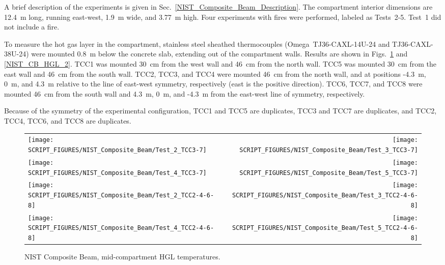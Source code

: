 A brief description of the experiments is given in Sec.~\ref{NIST_Composite_Beam_Description}. The compartment interior dimensions are 12.4~m long, running east-west, 1.9~m wide, and 3.77~m high. Four experiments with fires were performed, labeled as Tests~2-5. Test~1 did not include a fire.

To measure the hot gas layer in the compartment, stainless steel sheathed thermocouples (Omega~TJ36-CAXL-14U-24 and TJ36-CAXL-38U-24) were mounted 0.8~m below the concrete slab, extending out of the compartment walls. Results are shown in Figs.~\ref{NIST_CB_HGL_1} and \ref{NIST_CB_HGL_2}. TCC1 was mounted 30~cm from the west wall and 46~cm from the north wall. TCC5 was mounted 30~cm from the east wall and 46~cm from the south wall. TCC2, TCC3, and TCC4 were mounted 46~cm from the north wall, and at positions -4.3~m, 0~m, and 4.3~m relative to the line of east-west symmetry, respectively (east is the positive direction). TCC6, TCC7, and TCC8 were mounted 46~cm from the south wall and 4.3~m, 0~m, and -4.3~m from the east-west line of symmetry, respectively.

Because of the symmetry of the experimental configuration, TCC1 and TCC5 are duplicates, TCC3 and TCC7 are duplicates, and TCC2, TCC4, TCC6, and TCC8 are duplicates.


\newpage

\begin{figure}[p]
\begin{tabular*}{\textwidth}{l@{\extracolsep{\fill}}r}
\texttt{[image: SCRIPT\_FIGURES/NIST\_Composite\_Beam/Test\_2\_TCC3-7]} &
\texttt{[image: SCRIPT\_FIGURES/NIST\_Composite\_Beam/Test\_3\_TCC3-7]} \\
\texttt{[image: SCRIPT\_FIGURES/NIST\_Composite\_Beam/Test\_4\_TCC3-7]} &
\texttt{[image: SCRIPT\_FIGURES/NIST\_Composite\_Beam/Test\_5\_TCC3-7]} \\
\texttt{[image: SCRIPT\_FIGURES/NIST\_Composite\_Beam/Test\_2\_TCC2-4-6-8]} &
\texttt{[image: SCRIPT\_FIGURES/NIST\_Composite\_Beam/Test\_3\_TCC2-4-6-8]} \\
\texttt{[image: SCRIPT\_FIGURES/NIST\_Composite\_Beam/Test\_4\_TCC2-4-6-8]} &
\texttt{[image: SCRIPT\_FIGURES/NIST\_Composite\_Beam/Test\_5\_TCC2-4-6-8]}
\end{tabular*}
\caption[NIST Composite Beam, mid-compartment HGL temperatures]
{NIST Composite Beam, mid-compartment HGL temperatures.}
\label{NIST_CB_HGL_1}
\end{figure}

